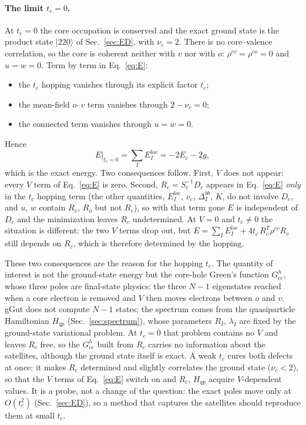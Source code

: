 \documentclass[11pt]{article}
\newcommand{\ket}[1]{|#1\rangle}
\begin{document}
\paragraph{The limit $t_c=0$.} At $t_c=0$ the core occupation is conserved and the exact ground state is the product state $\ket{220}$ of Sec.~\ref{sec:ED},
with $\nu_c=2$. There is no core--valence correlation, so the core is
coherent neither with $v$ nor with $o$: $\rho^{cv}=\rho^{co}=0$ and $u=w=0$. Term by term in Eq.~\eqref{eq:E}:
\begin{itemize}
\item the $t_c$ hopping vanishes through its explicit factor $t_c$;
\item the mean-field $o$--$v$ term vanishes through $2-\nu_c=0$;
\item the connected term vanishes through $u=w=0$.
\end{itemize}
Hence
\begin{equation}
E\big|_{t_c=0}=\sum_IE^{loc}_I=-2E_c-2g ,
\end{equation}
which is the exact energy. Two consequences follow. First, $V$ does not appear: every $V$ term of Eq.~\eqref{eq:E} is zero. Second, $R_c=S_c^{-1}D_c$
appears in Eq.~\eqref{eq:E} \emph{only} in the $t_c$ hopping term (the other quantities, $E^{loc}_I$, $\nu_c$, $\Delta^{bb}_I$, $K$, do not involve $D_c$, and
$u$, $w$ contain $R_v$, $R_o$ but not $R_c$), so with that term gone $E$ is independent of $D_c$ and the minimization leaves $R_c$ undetermined.
At $V=0$ and $t_c\neq0$ the situation is different: the two $V$ terms drop out, but $E=\sum_IE^{loc}_I+4t_c\,R_c^T\rho^{cv}R_v$ still depends on $R_c$, which is
therefore determined by the hopping.

These two consequences are the reason for the hopping $t_c$. The quantity of interest is not the ground-state energy but the core-hole Green's
function $G^h_{cc}$, whose three poles are final-state physics: the three $N-1$ eigenstates reached when a core
electron is removed and $V$ then moves electrons between $o$ and $v$. gGut does not compute $N-1$ states; the spectrum comes from the
quasiparticle Hamiltonian $H_{qp}$ (Sec.~\ref{sec:spectrum}), whose parameters $R_I$, $\lambda_I$ are fixed by the ground-state variational problem. At $t_c=0$
that problem contains no $V$ and leaves $R_c$ free, so the $G^h_{cc}$ built from $R_c$ carries no information about the satellites, although the ground
state itself is exact. A weak $t_c$ cures both defects at once: it makes $R_c$ determined and slightly correlates the ground state ($\nu_c<2$), so that the
$V$ terms of Eq.~\eqref{eq:E} switch on and $R_c$, $H_{qp}$ acquire $V$-dependent values. It is a probe, not a change of the question: the exact poles
move only at $O(t_c^2)$ (Sec.~\ref{sec:ED}), so a method that captures the satellites should reproduce them at small $t_c$.
\end{document}
